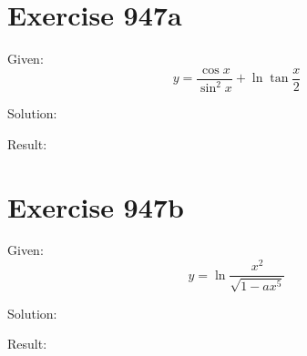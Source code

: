 \documentclass[a4paper, 10pt]{scrartcl}
\begin{document}
\section{Exercise 947a}

Given:
\[
y = \frac{\cos{x}}{\sin^{2}{x}} + \ln{\tan{\frac{x}{2}}}
\]

Solution:

Result:

\section{Exercise 947b}

Given:
\[
y = \ln{\frac{x^{2}}{\sqrt{1 - ax^{5}}}}
\]

Solution:

Result:
\end{document}
